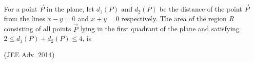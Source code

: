 \iffalse
\tiitle{Assignment-2}
\author{AI24BTECH11036- Shreedhanvi Yadlapally}
\section{integer}
\fi
	\item For a point $\vec{P}$ in the plane, let $d_{1}(P)$ and $d_{2}(P)$ be the 
		distance of the point $\vec{P}$ from the lines $x-y=0$ and $x+y =0$ 
respectively. The area of the region $R$ consisting of all points 
		$\vec{P}$ lying in the first quadrant of the plane and satisfying
$2\leq d_{1}(P)+d_{2}(P) \leq4$, is

		\hfill{(JEE Adv. 2014)}

